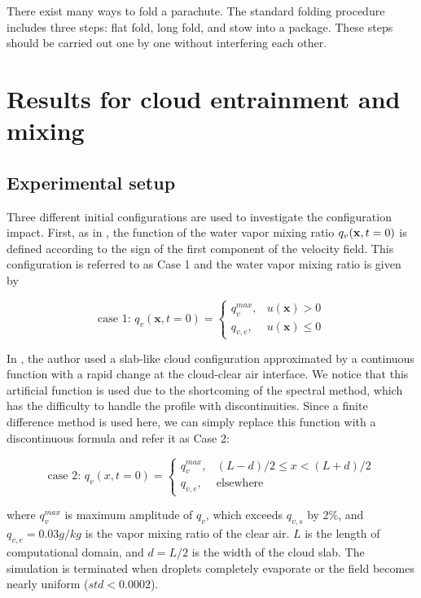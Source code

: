There exist many ways to fold a parachute. The standard folding procedure includes three steps: flat fold, long fold, and stow into a package. These steps should be carried out one by one without interfering each other.
\section{Results for cloud entrainment and mixing}
\subsection{Experimental setup}
Three different initial configurations are used to investigate
the configuration impact. First, as in \cite{Andrejczuk2004}, the function of the water vapor mixing 
ratio $q_v(\mathbf{x}, t = 0)$ is defined according to the sign of the first component of the velocity 
field. This configuration is referred to as Case 1 and the water vapor mixing ratio is
given by

\begin{equation}
\mbox{case 1: } q_v(\mathbf{x},t=0) = 
\left\{\begin{array}{lr}
q_v^{max}, & u(\mathbf{x}) > 0\\
q_{v,e}, & u(\mathbf{x}) \le 0
\end{array}\right.\label{case1}
\end{equation}

In \cite{Kumar2012Cloud}, the author used a slab-like cloud configuration approximated by a continuous 
function with a rapid change at the cloud-clear air interface. We notice that this artificial function is 
used due to the shortcoming of the spectral method, which has the difficulty to handle the profile with discontinuities. Since a finite difference method is used here, we can simply replace this function with a discontinuous formula and refer it as Case 2:

\begin{equation}
\mbox{case 2: } q_v(x,t=0) = 
\left\{\begin{array}{lr}
q_v^{max}, & (L-d)/2 \le x < (L+d)/2\\
q_{v,e}, & \mbox{elsewhere}
\end{array}\right.\label{case2}
\end{equation}

where $q_v^{max}$ is maximum amplitude of $q_v$, which exceeds $q_{v,s}$ by
$2\%$, and $q_{v,e} = 0.03g/kg$ is the vapor mixing ratio of the clear air. $L$
is the length of computational domain, and $d = L/2$ is the width of the cloud
slab. The simulation is terminated when droplets completely evaporate or the
field becomes nearly uniform ($std<0.0002$).

